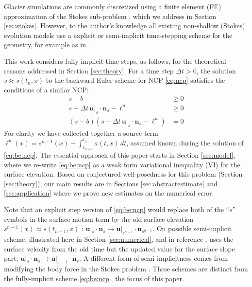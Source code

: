 \documentclass[hidelinks,onefignum,onetabnum,final]{siamart220329}  %
\newcommand{\bn}{\mathbf{n}}
\newcommand{\bu}{\mathbf{u}}
\begin{document}
Glacier simulations are commonly discretized using a finite element (FE) approximation of the Stokes sub-problem \cite{IsaacStadlerGhattas2015,Jouvetetal2008,Pattynetal2008}, which we address in Section \ref{sec:stokes}.  However, to the author's knowledge all existing non-shallow (Stokes) evolution models use a explicit or semi-implicit time-stepping scheme for the geometry, for example as in \cite{Durandetal2009,Jouvetetal2008,LofgrenAhlkronaHelanow2022,WirbelJarosch2020}.

This work considers fully implicit time steps, as follows, for the theoretical reasons addressed in Section \ref{sec:theory}.  For a time step $\Delta t > 0$, the solution $s\approx s(t_n,x)$ to the backward Euler scheme for NCP \eqref{eq:ncp} satisfies the conditions of a similar NCP:
\begin{subequations}
\label{eq:be:ncp}
\begin{align}
s - b &\ge 0 \label{eq:be:ncp:constraint} \\
s - \Delta t\,\bu|_s \cdot \bn_s - \ell^n &\ge 0 \label{eq:be:ncp:residualpos} \\
(s - b) \left(s - \Delta t\,\bu|_s \cdot \bn_s - \ell^n\right) &= 0 \label{eq:be:ncp:complementarity}
\end{align}
\end{subequations}
For clarity we have collected-together a source term $\ell^n(x) = s^{n-1}(x) + \int_{t_{n-1}}^{t_n} a(t,x)\,dt$, assumed known during the solution of \eqref{eq:be:ncp}.  The essential approach of this paper starts in Section \ref{sec:model}, where we re-write \eqref{eq:be:ncp} as a weak form variational inequality (VI) for the surface elevation.  Based on conjectured well-posedness for this problem (Section \ref{sec:theory}), our main results are in Sections \ref{sec:abstractestimate} and \ref{sec:application} where we prove new estimates on the numerical error.

Note that an explicit step version of \eqref{eq:be:ncp} would replace both of the ``$s$'' symbols in the surface motion term by the old surface elevation $s^{n-1}(x)\approx s(t_{n-1},x)$ \cite{Lengetal2012}: $\bu|_s \cdot \bn_s \to \bu|_{s^{n-1}} \cdot \bn_{s^{n-1}}$.  On possible semi-implicit scheme, illustrated here in Section \ref{sec:numerical}, and in reference \cite{LofgrenAhlkronaHelanow2022}, uses the surface velocity from the old time but the updated value for the surface slope part: $\bu|_s \cdot \bn_s \to \bu|_{s^{n-1}} \cdot \bn_s$.  A different form of semi-implicitness comes from modifying the body force in the Stokes problem \cite{LofgrenAhlkronaHelanow2022}.  These schemes are distinct from the fully-implicit scheme \eqref{eq:be:ncp}, the focus of this paper.
\end{document}
